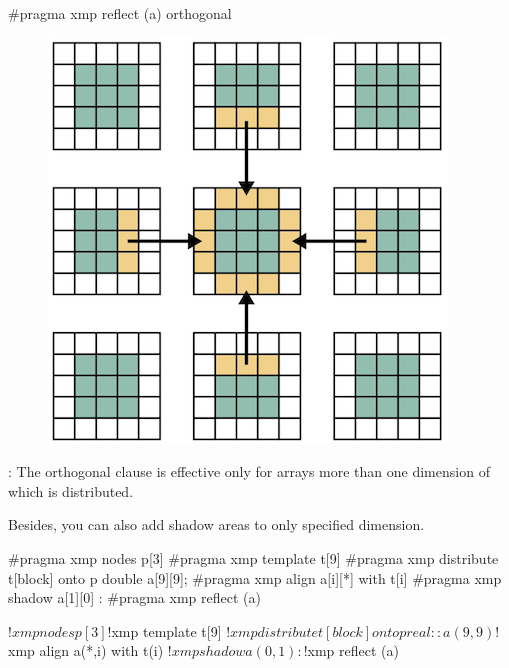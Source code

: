 \begin{XCexample}
#pragma xmp reflect (a) orthogonal
\end{XCexample}


\begin{figure}
  \centering
  \includegraphics{figs/multi_orthogonal.png}
\end{figure}

\noindent\hrulefill

: The orthogonal clause is effective only for arrays
more than one 
dimension of which is distributed.

\noindent\hrulefill

Besides, you can also add shadow areas to only specified dimension.

\begin{XCexample}
#pragma xmp nodes p[3]
#pragma xmp template t[9]
#pragma xmp distribute t[block] onto p
double a[9][9];
#pragma xmp align a[i][*] with t[i]
#pragma xmp shadow a[1][0]
  :
#pragma xmp reflect (a)
\end{XCexample}

\begin{XFexample}
!$xmp nodes p[3]
!$xmp template t[9]
!$xmp distribute t[block] onto p
real :: a(9,9)
!$xmp align a(*,i) with t(i)
!$xmp shadow a(0,1)
  :
!$xmp reflect (a)
\end{XFexample}

